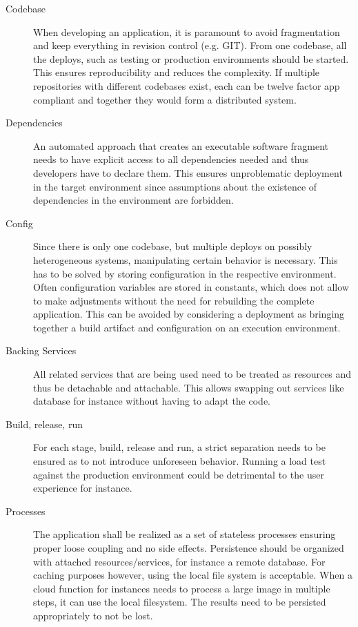 \setlength{\leftmargini}{0pt} 
\begin{description}
	\item[Codebase] When developing an application, it is paramount to avoid fragmentation and keep everything in revision control (e.g. GIT). From one codebase, all the deploys, such as testing or production environments should be started. This ensures reproducibility and reduces the complexity. If multiple repositories with different codebases exist, each can be twelve factor app compliant and together they would form a distributed system.
	\item[Dependencies] An automated approach that creates an executable software fragment needs to have explicit access to all dependencies needed and thus developers have to declare them. This ensures unproblematic deployment in the target environment since assumptions about the existence of dependencies in the environment are forbidden. 
	\item[Config] Since there is only one codebase, but multiple deploys on possibly heterogeneous systems, manipulating certain behavior is necessary. This has to be solved by storing configuration in the respective environment. Often configuration variables are stored in constants, which does not allow to make adjustments without the need for rebuilding the complete application. This can be avoided by considering a deployment as bringing together a build artifact and configuration on an execution environment.
	\item[Backing Services] All related services that are being used need to be treated as resources and thus be detachable and attachable. This allows swapping out services like database for instance without having to adapt the code. 
	\item[Build, release, run] For each stage, build, release and run, a strict separation needs to be ensured as to not introduce unforeseen behavior. Running a load test against the production environment could be detrimental to the user experience for instance. 
	\item[Processes] The application shall be realized as a set of stateless processes ensuring proper loose coupling and no side effects. Persistence should be organized with attached resources/services, for instance a remote database. For caching purposes however, using the local file system is acceptable. When a cloud function for instances needs to process a large image in multiple steps, it can use the local filesystem. The results need to be persisted appropriately to not be lost.

\end{description}
